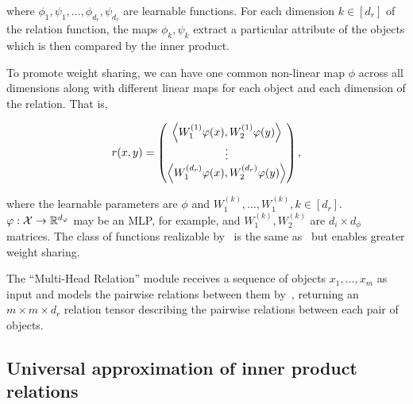 \noindent where $\phi_1, \psi_1, \ldots, \phi_{d_r}, \psi_{d_r}$ are learnable functions. For each dimension $k \in [d_r]$ of the relation function, the maps $\phi_k, \psi_k$ extract a particular attribute of the objects which is then compared by the inner product.

To promote weight sharing, we can have one common non-linear map $\phi$ across all dimensions along with different linear maps for each object and each dimension of the relation. That is,

\begin{equation}\label{eq:relation_function_lin_proj}
    r(x, y) = \begin{pmatrix}
        \left \langle W_1^{(1)}\varphi(x), W_2^{(1)}\varphi(y) \right\rangle \\
        \vdots \\
        \left \langle W_1^{(d_r)}\varphi(x), W_2^{(d_r)}\varphi(y) \right\rangle \\
    \end{pmatrix},
\end{equation}

\noindent where the learnable parameters are $\phi$ and $W_1^{(k)}, \ldots, W_1^{(k)}, k \in [d_r]$. $\varphi: {\mathcal{X}} \to \mathbb{R}^{d_\varphi}$ may be an MLP, for example, and $W_1^{(k)}, W_2^{(k)}$ are $d_i \times d_\phi$ matrices. The class of functions realizable by~ is the same as~ but enables greater weight sharing.

The ``Multi-Head Relation'' module receives a sequence of objects $x_1, \ldots, x_m$ as input and models the pairwise relations between them by~, returning an $m \times m \times d_r$ relation tensor describing the pairwise relations between each pair of objects.

\subsection{Universal approximation of inner product relations}

